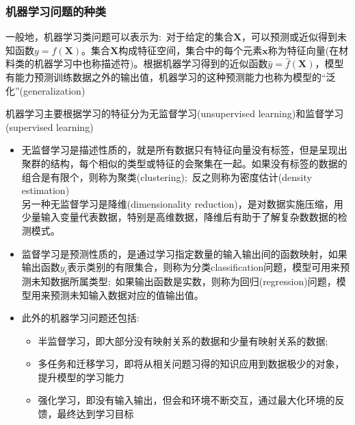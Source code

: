 \frame
{
	\frametitle{机器学习问题的种类}
一般地，机器学习类问题可以表示为:~对于给定的集合$\mathbf{X}$，可以预测或近似得到未知函数$y=f(\mathbf{X})$。集合$\mathbf{X}$构成特征空间，集合中的每个元素$\mathbf{x}$称为特征向量(在材料类的机器学习中也称描述符)。根据机器学习得到的近似函数$\hat{y}=\hat{f}(\mathbf{X})$，模型有能力预测训练数据之外的输出值，机器学习的这种预测能力也称为模型的“泛化”\textrm{(generalization)}

机器学习主要根据学习的特征分为无监督学习\textrm{(unsupervised learning)}和监督学习\textrm{(supervised learning)}
\begin{itemize}
	\item 无监督学习是描述性质的，就是所有数据只有特征向量没有标签，但是呈现出聚群的结构，每个相似的类型或特征的会聚集在一起。如果没有标签的数据的组合是有限个，则称为聚类\textrm{(clustering)};~反之则称为密度估计\textrm{(density estimation)}\\
		另一种无监督学习是降维\textrm{(dimensionality reduction)}，是对数据实施压缩，用少量输入变量代表数据，特别是高维数据，降维后有助于了解复杂数数据的检测模式。
	\item 监督学习是预测性质的，是通过学习指定数量的输入输出间的函数映射，如果输出函数$y_{\mathrm{i}}$表示类别的有限集合，则称为分类\textrm{classification}问题，模型可用来预测未知数据所属类型;~如果输出函数是实数，则称为回归\textrm{(regression)}问题，模型用来预测未知输入数据对应的值输出值。
	\item 此外的机器学习问题还包括:~
\begin{itemize}
	\item 半监督学习，即大部分没有映射关系的数据和少量有映射关系的数据;
	\item 多任务和迁移学习，即将从相关问题习得的知识应用到数据极少的对象，提升模型的学习能力
	\item 强化学习，即没有输入输出，但会和环境不断交互，通过最大化环境的反馈，最终达到学习目标
\end{itemize}
\end{itemize}
}

